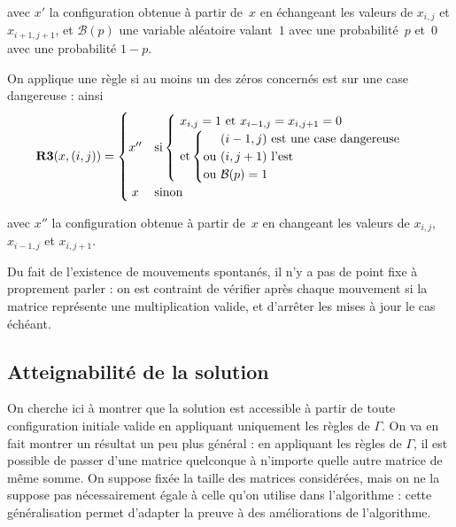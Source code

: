 \documentclass[11pt, openany, a4paper]{article}
\begin{document}
avec $x'$ la configuration obtenue à partir de~$x$ en échangeant les valeurs de $x_{i,j}$ et $x_{i+1,j+1}$, et $\mathcal{B}(p)$ une variable aléatoire valant~$1$ avec une probabilité~$p$ et~$0$ avec une probabilité $1-p$.

On applique une règle si au moins un des zéros concernés est sur une case dangereuse : ainsi \[
\textbf{R3}(x,(i,j))=
\begin{cases}
  \hfill x'' \hfill & \text {si} \begin{cases}\text{ $x_{i,j}=1$ et $x_{i-1,j}=x_{i,j+1}=0$} \\
    \text{ et} \left\{
        \begin{tabular}{@{}c@{}l}
          &\text{ $(i-1,j)$ est une case dangereuse}\\
          \text {ou}& \text{ $(i,j+1)$ l'est}\\
          \text {ou}& \text{ $\mathcal{B}(p)=1$}\\
        \end{tabular}
      \right.
    \end{cases}
  \\
  \hfill x \hfill & \text {sinon}
\end{cases}
\]

avec $x''$ la configuration obtenue à partir de~$x$ en changeant les valeurs de $x_{i,j}$, $x_{i-1,j}$ et $x_{i,j+1}$.

\medskip

Du fait de l'existence de mouvements spontanés, il n'y a pas de point fixe à proprement parler : on est contraint de vérifier après chaque mouvement si la matrice représente une multiplication valide, et d'arrêter les mises à jour le cas échéant. 

\subsection*{Atteignabilité de la solution}

On cherche ici à montrer que la solution est accessible à partir de toute configuration initiale valide en appliquant uniquement les règles de $\Gamma$. On va en fait montrer un résultat un peu plus général : en appliquant les règles de $\Gamma$, il est possible de passer d'une matrice quelconque à n'importe quelle autre matrice de même somme. On suppose fixée la taille des matrices considérées, mais on ne la suppose pas nécessairement égale à celle qu'on utilise dans l'algorithme : cette généralisation permet d'adapter la preuve à des améliorations de l'algorithme.
\end{document}

